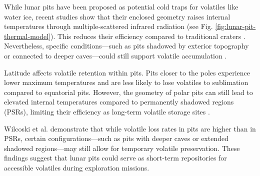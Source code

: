 While lunar pits have been proposed as potential cold traps for volatiles like water ice, recent studies show that their enclosed geometry raises internal temperatures through multiple-scattered infrared radiation (see Fig. \ref{fig:lunar-pit-thermal-model}). This reduces their efficiency compared to traditional craters \cite{newer-thermal}. Nevertheless, specific conditions—such as pits shadowed by exterior topography or connected to deeper caves—could still support volatile accumulation \cite{thermal-lunar-pits, lunar-pits-numerical-modelling}.

Latitude affects volatile retention within pits. Pits closer to the poles experience lower maximum temperatures and are less likely to lose volatiles to sublimation compared to equatorial pits. However, the geometry of polar pits can still lead to elevated internal temperatures compared to permanently shadowed regions (PSRs), limiting their efficiency as long-term volatile storage sites \cite{newer-thermal, lunar-pits-numerical-modelling}.

Wilcoski et al. \cite{newer-thermal} demonstrate that while volatile loss rates in pits are higher than in PSRs, certain configurations—such as pits with deeper caves or extended shadowed regions—may still allow for temporary volatile preservation. These findings suggest that lunar pits could serve as short-term repositories for accessible volatiles during exploration missions.
